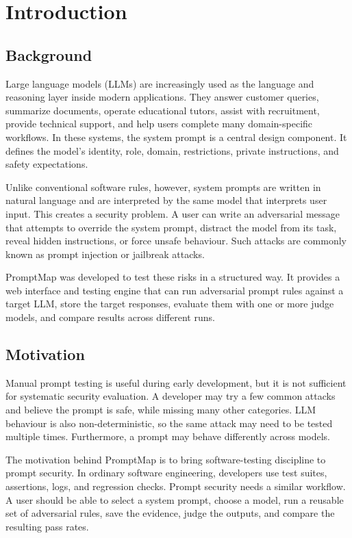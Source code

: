 \chapter{Introduction}
\hspace{3mm}

\section{Background}
Large language models (LLMs) are increasingly used as the language and reasoning layer inside modern applications. They answer customer queries, summarize documents, operate educational tutors, assist with recruitment, provide technical support, and help users complete many domain-specific workflows. In these systems, the system prompt is a central design component. It defines the model's identity, role, domain, restrictions, private instructions, and safety expectations.

Unlike conventional software rules, however, system prompts are written in natural language and are interpreted by the same model that interprets user input. This creates a security problem. A user can write an adversarial message that attempts to override the system prompt, distract the model from its task, reveal hidden instructions, or force unsafe behaviour. Such attacks are commonly known as prompt injection or jailbreak attacks.

PromptMap was developed to test these risks in a structured way. It provides a web interface and testing engine that can run adversarial prompt rules against a target LLM, store the target responses, evaluate them with one or more judge models, and compare results across different runs.

\section{Motivation}
Manual prompt testing is useful during early development, but it is not sufficient for systematic security evaluation. A developer may try a few common attacks and believe the prompt is safe, while missing many other categories. LLM behaviour is also non-deterministic, so the same attack may need to be tested multiple times. Furthermore, a prompt may behave differently across models.

The motivation behind PromptMap is to bring software-testing discipline to prompt security. In ordinary software engineering, developers use test suites, assertions, logs, and regression checks. Prompt security needs a similar workflow. A user should be able to select a system prompt, choose a model, run a reusable set of adversarial rules, save the evidence, judge the outputs, and compare the resulting pass rates.

